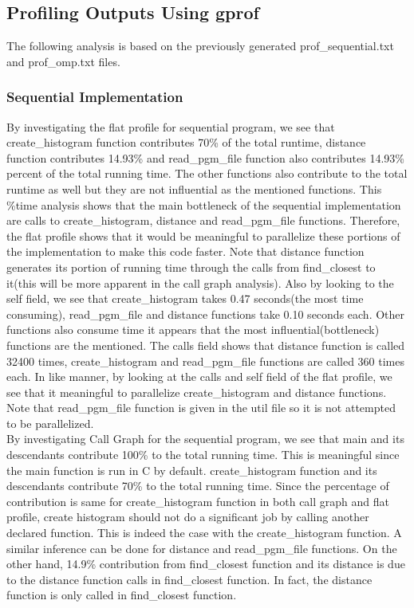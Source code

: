 \documentclass{article}
\begin{document}
\subsection{Profiling Outputs Using gprof}
\qquad The following analysis is based on the previously generated prof\_sequential.txt and prof\_omp.txt files.
\subsubsection{Sequential Implementation}
\qquad  By investigating the flat profile for sequential program, we see that create\_histogram function contributes 70\% of the total runtime, distance function contributes 14.93\% and read\_pgm\_file function also contributes 14.93\% percent of the total running time. The other functions also contribute to the total runtime as well but they are not influential as the mentioned functions. This \%time analysis shows that the main bottleneck of the sequential implementation are calls to create\_histogram, distance and read\_pgm\_file functions. Therefore, the flat profile shows that it would be meaningful to parallelize these portions of the implementation to make this code faster. Note that distance function generates its portion of running time through the calls from find\_closest to it(this will be more apparent in the call graph analysis). Also by looking to the self field, we see that create\_histogram takes 0.47 seconds(the most time consuming), read\_pgm\_file and distance functions take 0.10 seconds each. Other functions also consume time it appears that the most influential(bottleneck) functions are the mentioned. The calls field shows that distance function is called 32400 times, create\_histogram and read\_pgm\_file functions are called 360 times each. In like manner, by looking at the calls and self field of the flat profile, we see that it meaningful to parallelize create\_histogram and distance functions. Note that read\_pgm\_file function is given in the util file so it is not attempted to be parallelized. \\
\null \qquad By investigating Call Graph for the sequential program, we see that main and its descendants contribute 100\% to the total running time. This is meaningful since  the main function is run in C  by default. create\_histogram function and its descendants contribute 70\% to the total running time. Since the percentage of contribution is same for create\_histogram function in both call graph and flat profile, create histogram should not do a significant job by calling another declared function. This is indeed the case with the create\_histogram function. A similar inference can be done for distance and read\_pgm\_file functions. On the other hand, 14.9\% contribution from find\_closest function and its distance is due to the distance function calls in find\_closest function. In fact, the distance function is only called in find\_closest function. 
\end{document}
